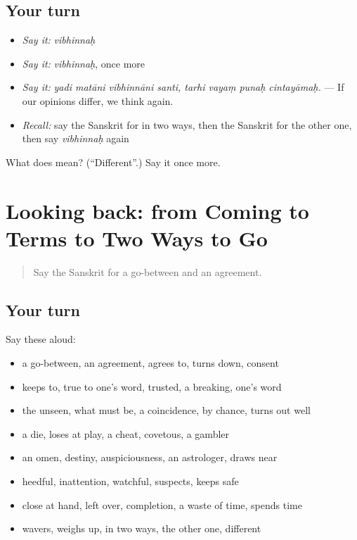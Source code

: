 \subsection*{Your turn}
\begin{itemize}
\raggedright
  \item \emph{Say it:} \emph{vibhinnaḥ}
  \item \emph{Say it:} \emph{vibhinnaḥ}, once more
  \item \emph{Say it:} \emph{yadi matāni vibhinnāni santi, tarhi vayaṃ punaḥ cintayāmaḥ.} — If our opinions differ, we think again.
  \item \emph{Recall:} say the Sanskrit for in two ways, then the Sanskrit for the other one, then say \emph{vibhinnaḥ} again
\end{itemize}

\begin{tcolorbox}[breakable,colback=teal!4,colframe=teal!35!black,title={Before you move on}]
What does  mean? (\textquotedblleft{}Different\textquotedblright{}.) Say it once more.
\end{tcolorbox}
\section[(dialogue)]{Looking back: from Coming to Terms to Two Ways to Go}

\label{lesson:SA-R541-review-534-541}



\begin{quote}
Say the Sanskrit for a go-between and an agreement.
\end{quote}

\subsection*{Your turn}
Say these aloud:

\begin{itemize}
\raggedright
  \item a go-between, an agreement, agrees to, turns down, consent
  \item keeps to, true to one's word, trusted, a breaking, one's word
  \item the unseen, what must be, a coincidence, by chance, turns out well
  \item a die, loses at play, a cheat, covetous, a gambler
  \item an omen, destiny, auspiciousness, an astrologer, draws near
  \item heedful, inattention, watchful, suspects, keeps safe
  \item close at hand, left over, completion, a waste of time, spends time
  \item wavers, weighs up, in two ways, the other one, different
\end{itemize}


